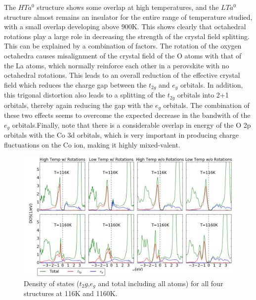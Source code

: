 \documentclass[10pt]{ruthesis}
\begin{document}
{The $HTa^0$ structure  shows some overlap at high temperatures, and the $LTa^0$ structure almost remains an insulator for the entire range of temperature studied, with a small overlap developing above 900K. 
%
This shows clearly that octahedral rotations play a large role in decreasing the strength of the crystal field splitting. 
This can be explained by a combination of factors. The rotation of the oxygen octahedra causes misalignment of the crystal field of the O atoms with that of the La atoms, which normally reinforce each other in a  perovskite with no octahedral rotations. This leads to an overall reduction of the effective crystal field which reduces the charge gap between the $t_{2g}$ and $e_g$ orbitals. In addition, this trigonal distortion also leads to a splitting of the $t_{2g}$ orbitals into 2+1 orbitals, thereby again reducing the gap with the $e_g$ orbitals. The combination of these two effects seems to overcome the expected decrease in the bandwith of the $e_g$ orbitals.Finally, note that there is a considerable overlap in energy of the O 2p orbitals with the Co 3d orbitals, which is very important in producing charge fluctuations on the Co ion, making it highly mixed-valent. 

\begin{figure}\label{LaCoO3_dos}
\begin{center}
\includegraphics[width=\columnwidth]{plots_final/output/New_Dos.png}
\caption{Density of states ($t_2g$,$e_g$ and total including all atoms) for all four structures at 116K and 1160K.}
\end{center}
\end{figure}

}
\end{document}
